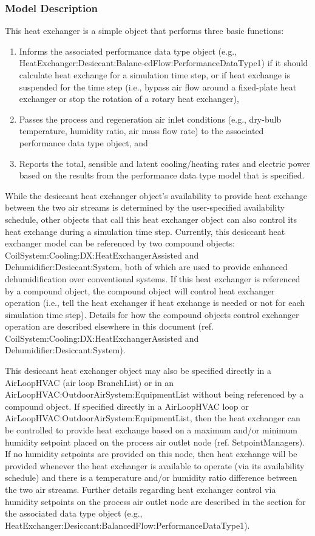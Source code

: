 \subsubsection{Model Description}\label{model-description-2-006}

This heat exchanger is a simple object that performs three basic functions:

\begin{enumerate}
\item Informs the associated performance data type object (e.g., HeatExchanger:Desiccant:Balanc-edFlow:PerformanceDataType1) if it should calculate heat exchange for a simulation time step, or if heat exchange is suspended for the time step (i.e., bypass air flow around a fixed-plate heat exchanger or stop the rotation of a rotary heat exchanger),
\item Passes the process and regeneration air inlet conditions (e.g., dry-bulb temperature, humidity ratio, air mass flow rate) to the associated performance data type object, and
\item Reports the total, sensible and latent cooling/heating rates and electric power based on the results from the performance data type model that is specified.
\end{enumerate}

While the desiccant heat exchanger object's availability to provide heat exchange between the two air streams is determined by the user-specified availability schedule, other objects that call this heat exchanger object can also control its heat exchange during a simulation time step. Currently, this desiccant heat exchanger model can be referenced by two compound objects: CoilSystem:Cooling:DX:HeatExchangerAssisted and Dehumidifier:Desiccant:System, both of which are used to provide enhanced dehumidification over conventional systems. If this heat exchanger is referenced by a compound object, the compound object will control heat exchanger operation (i.e., tell the heat exchanger if heat exchange is needed or not for each simulation time step). Details for how the compound objects control exchanger operation are described elsewhere in this document (ref. CoilSystem:Cooling:DX:HeatExchangerAssisted and Dehumidifier:Desiccant:System).

This desiccant heat exchanger object may also be specified directly in a AirLoopHVAC (air loop BranchList) or in an AirLoopHVAC:OutdoorAirSystem:EquipmentList without being referenced by a compound object. If specified directly in a AirLoopHVAC loop or AirLoopHVAC:OutdoorAirSystem:EquipmentList, then the heat exchanger can be controlled to provide heat exchange based on a maximum and/or minimum humidity setpoint placed on the process air outlet node (ref. SetpointManagers). If no humidity setpoints are provided on this node, then heat exchange will be provided whenever the heat exchanger is available to operate (via its availability schedule) and there is a temperature and/or humidity ratio difference between the two air streams. Further details regarding heat exchanger control via humidity setpoints on the process air outlet node are described in the section for the associated data type object (e.g., HeatExchanger:Desiccant:BalancedFlow:PerformanceDataType1).

